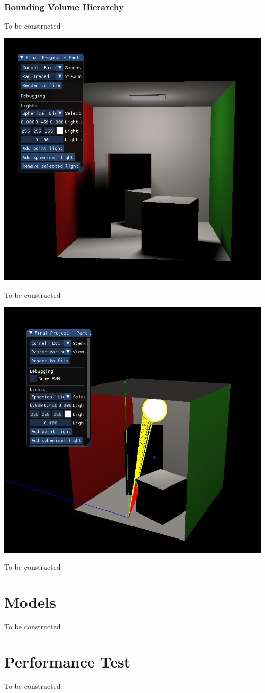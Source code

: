 \documentclass{article}
\begin{document}
    \subsubsection{Bounding Volume Hierarchy}
    To be constructed

    \begin{center}
        \includegraphics[scale=0.80]{images/soft_shadow_showcase.png}

        To be constructed

        \includegraphics[scale=0.80]{images/soft_shadow_debug.png}

        To be constructed
    \end{center}

    \section{Models}
    To be constructed

    \section{Performance Test}
    To be constructed
\end{document}
